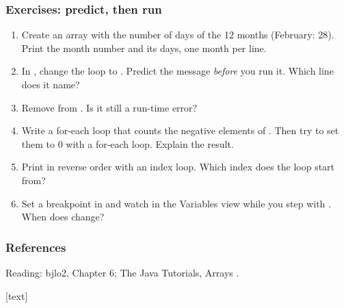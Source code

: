 \documentclass[aspectratio=169,10pt,compress]{beamer}
\begin{document}
\begin{frame}[t,fragile] \frametitle{Exercises: predict, then run}
	\begin{enumerate}\small
		\item Create an array with the number of days of the 12 months (February: 28).
		      Print the month number and its days, one month per line.
		\item In , change the loop to .
		      Predict the message \emph{before} you run it. Which line does it name?
		\item Remove  from . Is it still a run-time error?
		\item Write a for-each loop that counts the negative elements of
		      . Then try to set them to 0 with a for-each loop. Explain the result.
		\item Print  in reverse order with an index loop.
		      Which index does the loop start from?
		\item Set a breakpoint in  and watch  in the Variables view
		      while you step with . When does  change?
	\end{enumerate}
\end{frame}




\begin{frame}[t,fragile] \frametitle{References}
	\small Reading: bjlo2, Chapter 6; The Java Tutorials, Arrays \cite{TheJavaTutorialsArray}.

	\vspace{1em}
	[text]
	
	\tiny
\end{frame}




\begin{frame}[t,fragile]
	\begin{center}
		\vspace{4cm}
	\end{center}
\end{frame}
\end{document}
